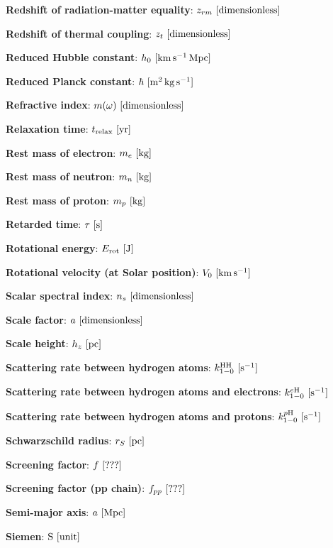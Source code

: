 \documentclass[a4paper,10pt]{article}
\begin{document}
{\noindent}\textbf{Redshift of radiation-matter equality}: $z_{rm} ~ [{\rm dimensionless}]$

{\noindent}\textbf{Redshift of thermal coupling}: $z_t ~ [{\rm dimensionless}]$

{\noindent}\textbf{Reduced Hubble constant}: $h_0 ~ [{\rm km\,s^{-1}\,Mpc}]$

{\noindent}\textbf{Reduced Planck constant}: $\hbar ~ [{\rm m^2\,kg\,s^{-1}}]$

{\noindent}\textbf{Refractive index}: $m(\omega) ~ [{\rm dimensionless}]$

{\noindent}\textbf{Relaxation time}: $t_\mathrm{relax} ~ [{\rm yr}]$

{\noindent}\textbf{Rest mass of electron}: $m_e ~ [{\rm kg}]$

{\noindent}\textbf{Rest mass of neutron}: $m_n ~ [{\rm kg}]$

{\noindent}\textbf{Rest mass of proton}: $m_p ~ [{\rm kg}]$

{\noindent}\textbf{Retarded time}: $\tau ~ [{\rm s}]$

{\noindent}\textbf{Rotational energy}: $E_{\rm rot} ~ [{\rm J}]$

{\noindent}\textbf{Rotational velocity (at Solar position)}: $V_0 ~ [{\rm km\,s^{-1}}]$

{\noindent}\textbf{Scalar spectral index}: $n_s ~ [{\rm dimensionless}]$

{\noindent}\textbf{Scale factor}: $a ~ [{\rm dimensionless}]$

{\noindent}\textbf{Scale height}: $h_z ~ [{\rm pc}]$

{\noindent}\textbf{Scattering rate between hydrogen atoms}: $k_{1-0}^\mathrm{HH} ~ [{\rm s^{-1}}]$

{\noindent}\textbf{Scattering rate between hydrogen atoms and electrons}: $k_{1-0}^{e\mathrm{H}} ~ [{\rm s^{-1}}]$

{\noindent}\textbf{Scattering rate between hydrogen atoms and protons}: $k_{1-0}^{p\mathrm{H}} ~ [{\rm s^{-1}}]$

{\noindent}\textbf{Schwarzschild radius}: $r_S ~ [{\rm pc}]$

{\noindent}\textbf{Screening factor}: $f ~ [{\rm ???}]$

{\noindent}\textbf{Screening factor (pp chain)}: $f_{pp} ~ [{\rm ???}]$

{\noindent}\textbf{Semi-major axis}: $a ~ [{\rm Mpc}]$

{\noindent}\textbf{Siemen}: ${\rm S} ~ [{\rm unit}]$
\end{document}
